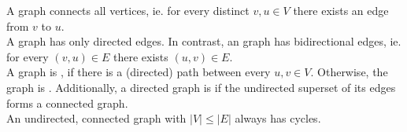 \documentclass[a3paper, landscape, 11pt]{article} %
\begin{document}
\begin{multicols*}{4}
{A  graph connects all vertices, ie. for every distinct $v,u \in V$ there exists an edge from $v$ to $u$.\\

A  graph has only directed edges. In contrast, an  graph has bidirectional edges, ie. for every $(v,u)\in E$ there exists $(u,v)\in E$.\\

A graph is , if there is a \nolinebreak(directed) path between every $u,v \in V$. Otherwise, the graph is . Additionally, a directed graph is  if the undirected superset of its edges forms a connected graph.\\

An undirected, connected graph with $|V| \le |E|$ always has cycles.\\

}
\end{multicols*}
\end{document}
